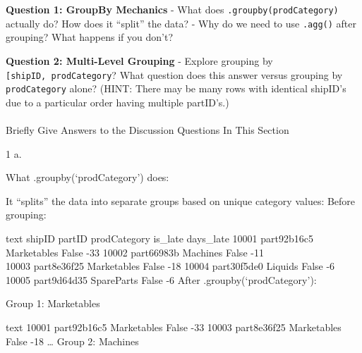 \documentclass[
  letterpaper,
  DIV=11,
  numbers=noendperiod]{scrartcl}
\makeatletter
\let\oldparagraph\paragraph
\renewcommand{\paragraph}{
    \@ifstar
      \xxxParagraphStar
      \xxxParagraphNoStar
  }
\newcommand{\xxxParagraphStar}[1]{\oldparagraph*{#1}\mbox{}}
\newcommand{\xxxParagraphNoStar}[1]{\oldparagraph{#1}\mbox{}}
\makeatother
\begin{document}
\begin{tcolorbox}[enhanced jigsaw, toptitle=1mm, opacityback=0, colframe=quarto-callout-important-color-frame, leftrule=.75mm, arc=.35mm, opacitybacktitle=0.6, breakable, titlerule=0mm, coltitle=black, bottomtitle=1mm, title=\textcolor{quarto-callout-important-color}{\faExclamation}\hspace{0.5em}{🤔 Discussion Questions: Split-Apply-Combine Mental Model}, colbacktitle=quarto-callout-important-color!10!white, rightrule=.15mm, left=2mm, bottomrule=.15mm, toprule=.15mm, colback=white]

\textbf{Question 1: GroupBy Mechanics} - What does
\texttt{.groupby(\textquotesingle{}prodCategory\textquotesingle{})}
actually do? How does it ``split'' the data? - Why do we need to use
\texttt{.agg()} after grouping? What happens if you don't?

\textbf{Question 2: Multi-Level Grouping} - Explore grouping by
\texttt{{[}\textquotesingle{}shipID\textquotesingle{},\ \textquotesingle{}prodCategory\textquotesingle{}{]}}?
What question does this answer versus grouping by
\texttt{\textquotesingle{}prodCategory\textquotesingle{}} alone? (HINT:
There may be many rows with identical shipID's due to a particular order
having multiple partID's.)

\end{tcolorbox}

\paragraph{Briefly Give Answers to the Discussion Questions In This
Section}\label{briefly-give-answers-to-the-discussion-questions-in-this-section-6}

1 a.

What .groupby(`prodCategory') does:

It ``splits'' the data into separate groups based on unique category
values: Before grouping:

text shipID partID prodCategory is\_late days\_late 10001 part92b16c5
Marketables False -33 10002 part66983b Machines False -11\\
10003 part8e36f25 Marketables False -18 10004 part30f5de0 Liquids False
-6 10005 part9d64d35 SpareParts False -6 After .groupby(`prodCategory'):

Group 1: Marketables

text 10001 part92b16c5 Marketables False -33 10003 part8e36f25
Marketables False -18 \ldots{} Group 2: Machines
\end{document}

